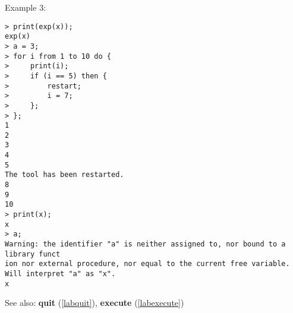 \noindent Example 3: 
\begin{center}\begin{minipage}{15cm}\begin{Verbatim}[frame=single]
> print(exp(x));
exp(x)
> a = 3;
> for i from 1 to 10 do {
>     print(i);
>     if (i == 5) then {
>         restart;
>         i = 7;
>     };
> };
1
2
3
4
5
The tool has been restarted.
8
9
10
> print(x);
x
> a;
Warning: the identifier "a" is neither assigned to, nor bound to a library funct
ion nor external procedure, nor equal to the current free variable.
Will interpret "a" as "x".
x
\end{Verbatim}
\end{minipage}\end{center}
See also: \textbf{quit} (\ref{labquit}), \textbf{execute} (\ref{labexecute})
